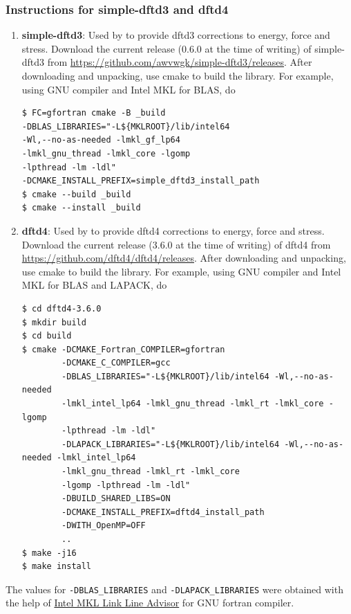 \subsubsection{Instructions for simple-dftd3 and dftd4}

\begin{enumerate}
	\item   {\bf simple-dftd3}: Used by \dftfe{} to provide dftd3 corrections to energy, force and stress. Download the current release (0.6.0 at the time of writing) of simple-dftd3 from \url{https://github.com/awvwgk/simple-dftd3/releases}. After downloading and unpacking, use cmake to build the library. For example, using GNU compiler and Intel MKL for BLAS, do
\begin{verbatim}
$ FC=gfortran cmake -B _build 
-DBLAS_LIBRARIES="-L${MKLROOT}/lib/intel64 
-Wl,--no-as-needed -lmkl_gf_lp64 
-lmkl_gnu_thread -lmkl_core -lgomp 
-lpthread -lm -ldl" 
-DCMAKE_INSTALL_PREFIX=simple_dftd3_install_path
$ cmake --build _build
$ cmake --install _build 
\end{verbatim}
	\item   {\bf dftd4}: Used by \dftfe{} to provide dftd4 corrections to energy, force and stress. Download the current release (3.6.0 at the time of writing) of dftd4 from \url{https://github.com/dftd4/dftd4/releases}. After downloading and unpacking, use cmake to build the library. For example, using GNU compiler and Intel MKL for BLAS and LAPACK, do
\begin{verbatim}
$ cd dftd4-3.6.0
$ mkdir build 
$ cd build
$ cmake -DCMAKE_Fortran_COMPILER=gfortran
        -DCMAKE_C_COMPILER=gcc
        -DBLAS_LIBRARIES="-L${MKLROOT}/lib/intel64 -Wl,--no-as-needed
        -lmkl_intel_lp64 -lmkl_gnu_thread -lmkl_rt -lmkl_core -lgomp 
        -lpthread -lm -ldl" 
        -DLAPACK_LIBRARIES="-L${MKLROOT}/lib/intel64 -Wl,--no-as-needed -lmkl_intel_lp64
        -lmkl_gnu_thread -lmkl_rt -lmkl_core 
        -lgomp -lpthread -lm -ldl"
        -DBUILD_SHARED_LIBS=ON 
        -DCMAKE_INSTALL_PREFIX=dftd4_install_path
        -DWITH_OpenMP=OFF
        ..
$ make -j16
$ make install
\end{verbatim}
\end{enumerate}
The values for \verb|-DBLAS_LIBRARIES| and \verb|-DLAPACK_LIBRARIES| were obtained with the help of \href{https://software.intel.com/en-us/articles/intel-mkl-link-line-advisor}{Intel MKL Link Line Advisor} for GNU fortran compiler.\\ 

